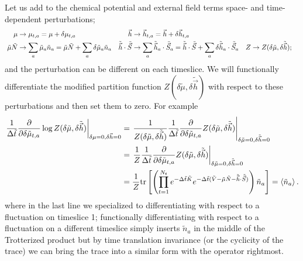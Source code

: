 Let us add to the chemical potential and external field terms space- and time-dependent perturbations;
\begin{align}
	\mu &\rightarrow \mu_{t,a} = \mu + \delta \mu_{t,a}
	&
	\vec{h} &\rightarrow \vec{h}_{t,a} = \vec{h} + \delta \vec{h}_{t,a}
	\\\
	\tilde{\mu} \tilde{N} & \rightarrow \sum_a \tilde{\mu}_a \tilde{n}_a = \tilde{\mu}\tilde{N} + \sum_a \delta\tilde{\mu}_a \tilde{n}_a
	&
	\tilde{\vec{h}} \cdot \tilde{\vec{S}} & \rightarrow \sum_a \tilde{\vec{h}}_a\cdot \tilde{\vec{S}}_a = \tilde{\vec{h}}\cdot\tilde{\vec{S}} + \sum_a \delta\tilde{\vec{h}}_a \cdot \tilde{\vec{S}}_a
	&
	Z &\rightarrow Z(\delta\tilde{\mu}, \delta\tilde{\vec{h}});
	\label{eq:local perturbations}
\end{align}
and the perturbation can be different on each timeslice.
We will functionally differentiate the modified partition function $Z(\delta\tilde{\mu}, \delta\tilde{\vec{h}})$ with respect to these perturbations and then set them to zero.
For example
\begin{align}
	\left.\frac{1}{\Delta\tilde{t}} \frac{\partial}{\partial \delta\tilde{\mu}_{t,a}} \log Z(\delta\tilde{\mu}, \delta\tilde{\vec{h}})\right|_{\delta\mu=0, \delta\vec{h}=0}
	&=
	\left.\frac{1}{Z(\delta\tilde{\mu}, \delta\tilde{\vec{h}})} \frac{1}{\Delta\tilde{t}} \frac{\partial}{\partial \delta\tilde{\mu}_{t,a}} Z(\delta\tilde{\mu}, \delta\tilde{\vec{h}})\right|_{\delta\tilde{\mu}=0, \delta\tilde{\vec{h}}=0}
	\nonumber\\
	&=
	\left.\frac{1}{Z} \frac{1}{\Delta\tilde{t}} \frac{\partial}{\partial \delta\tilde{\mu}_{t,a}} Z(\delta\tilde{\mu}, \delta\tilde{\vec{h}})\right|_{\delta\tilde{\mu}=0, \delta\tilde{\vec{h}}=0}
	\label{eq:functionally differentiate}\\
	&=\frac{1}{Z} \text{tr}\left[\left(\prod_{t=1}^{N_t}e^{-\Delta\tilde{t} \tilde{K}} e^{-\Delta\tilde{t}(\tilde{V} -\tilde{\mu}\tilde{N} - \tilde{\vec{h}}\cdot\tilde{\vec{S}})}\right) \tilde{n}_a\right] 
	= \left\langle \tilde{n}_a \right\rangle.
\end{align}
where in the last line we specialized to differentiating with respect to a fluctuation on timeslice 1; functionally differentiating with respect to a fluctuation on a different timeslice simply inserts $\tilde{n}_a$ in the middle of the Trotterized product but by time translation invariance (or the cyclicity of the trace) we can bring the trace into a similar form with the operator rightmost.

